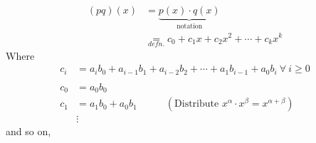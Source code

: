 \begin{definition}
    \begin{align}
        (pq)(x) &= \underbrace{p(x)\cdot q(x)}_{\text{notation}} \nonumber \\ 
        &\underset{defn.}{=} c_0 + c_1x + c_2x^2 + \cdots + c_kx^k \nonumber 
    \end{align}
    Where 
    \begin{align}
        c_i &= a_i b_0 + a_{i-1}b_1 + a_{i-2}b_{2} + \cdots + a_1b_{i-1} + a_0b_i \  \forall  \ i \geq 0 \nonumber \\
        \ \nonumber \\
        c_0 &= a_0b_0   \nonumber \\
        c_1 &= a_1b_0 + a_0b_1 \ \ \ \ \ \ \ \ \ \ \ \ \ (\text{Distribute } x^\alpha \cdot x^\beta = x^{\alpha + \beta}) \nonumber \\
        &\vdots \nonumber
    \end{align}
    and so on, 
\end{definition}

